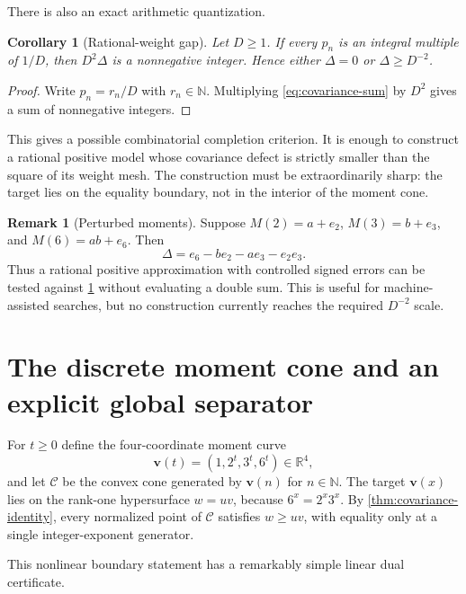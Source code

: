 \documentclass[11pt]{article}
\newtheorem{corollary}[theorem]{Corollary}
\theoremstyle{definition}
\newtheorem{remark}[theorem]{Remark}
\newcommand{\N}{\mathbb N}
\newcommand{\R}{\mathbb R}
\newcommand{\vct}[1]{\boldsymbol{#1}}
\begin{document}
There is also an exact arithmetic quantization.

\begin{corollary}[Rational-weight gap]\label{cor:rational-gap}
Let $D\ge1$.  If every $p_n$ is an integral multiple of $1/D$, then $D^2\Delta$ is a nonnegative integer.  Hence either $\Delta=0$ or $\Delta\ge D^{-2}$.
\end{corollary}
\begin{proof}
Write $p_n=r_n/D$ with $r_n\in\N$.  Multiplying \eqref{eq:covariance-sum} by $D^2$ gives a sum of nonnegative integers.
\end{proof}

This gives a possible combinatorial completion criterion.  It is enough to construct a rational positive model whose covariance defect is strictly smaller than the square of its weight mesh.  The construction must be extraordinarily sharp: the target lies on the equality boundary, not in the interior of the moment cone.

\begin{remark}[Perturbed moments]
Suppose $M(2)=a+e_2$, $M(3)=b+e_3$, and $M(6)=ab+e_6$.  Then
\begin{equation}\label{eq:defect-errors}
 \Delta=e_6-be_2-ae_3-e_2e_3.
\end{equation}
Thus a rational positive approximation with controlled signed errors can be tested against \cref{cor:rational-gap} without evaluating a double sum.  This is useful for machine-assisted searches, but no construction currently reaches the required $D^{-2}$ scale.
\end{remark}

\section{The discrete moment cone and an explicit global separator}\label{sec:cone}

For $t\ge0$ define the four-coordinate moment curve
\[
 \vct v(t)=(1,2^t,3^t,6^t)\in\R^4,
\]
and let $\mathcal C$ be the convex cone generated by $\vct v(n)$ for $n\in\N$.  The target $\vct v(x)$ lies on the rank-one hypersurface $w=uv$, because $6^x=2^x3^x$.  By \cref{thm:covariance-identity}, every normalized point of $\mathcal C$ satisfies $w\ge uv$, with equality only at a single integer-exponent generator.

This nonlinear boundary statement has a remarkably simple linear dual certificate.
\end{document}
